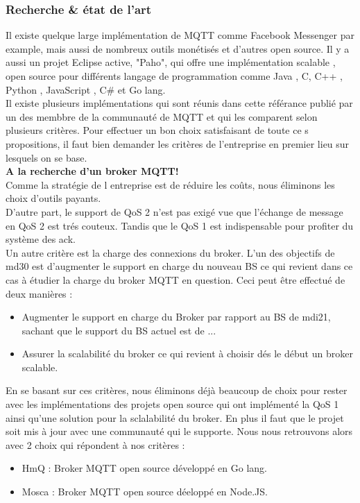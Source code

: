     \subsubsection{Recherche \& état de l'art}
            

        Il existe quelque large implémentation de MQTT comme Facebook Messenger par example, mais aussi de nombreux 
        outils monétisés et d'autres open source.
        Il y a aussi un projet Eclipse active, "Paho", qui offre une implémentation scalable , open source pour 
        différents langage de programmation comme Java , 
        C, C++ , Python , JavaScript , C\# et Go lang. \\
        Il existe plusieurs implémentations qui sont réunis dans cette référance \cite{mqtt_choix} publié par un des membbre de la communauté de MQTT et qui les comparent selon plusieurs critères. 
        Pour effectuer un bon choix satisfaisant de toute ce    s propositions, il faut bien demander les critères de l'entreprise en premier lieu 
        sur lesquels on se base. \\
        
        {\centering
        \textbf{A la recherche d'un broker MQTT! } \\}
        \vspace{0.2cm}
        Comme la stratégie de l entreprise est de réduire les coûts, nous éliminons les choix d'outils payants. \\
        D'autre part, le support de QoS 2 n'est pas exigé vue que l'échange de message en QoS 2 est trés couteux. 
        Tandis que le QoS 1 est indispensable pour profiter du système des ack.\\
        Un autre critère est la charge des connexions du broker. L'un des objectifs de \gls{md30} est d'augmenter le support 
        en charge du nouveau BS ce qui revient dans ce cas à étudier la charge du broker MQTT en question. 
        Ceci peut être effectué de deux manières : 
        \begin{itemize}
            \item Augmenter le support en charge du Broker par rapport au \gls{BS} de \gls{mdi21}, sachant que
            le support du BS actuel est de ... 
            \item Assurer la scalabilité du broker ce qui revient à choisir dés le début un broker scalable.
        \end{itemize} 
        \vspace{0.3cm}
        En se basant sur ces critères, nous éliminons déjà beaucoup de choix pour rester avec les implémentations des projets 
        open source qui ont implémenté la QoS 1 ainsi qu'une solution pour la sclalabilité du broker. En plus il faut que le projet soit mis 
        à jour avec une communauté qui le supporte.  
        Nous nous retrouvons alors avec 2 choix qui répondent à nos critères : 
        \begin{itemize}
            \item HmQ : Broker MQTT open source développé en Go lang. 
            \item Mosca : Broker MQTT open source déeloppé en Node.JS. 
        \end{itemize} 
        

